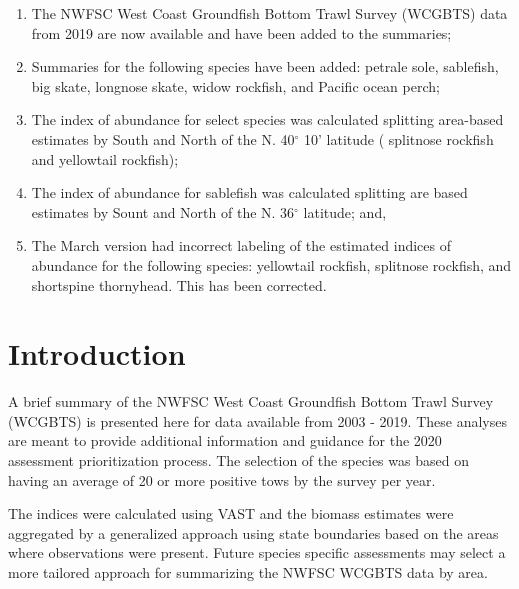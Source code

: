\documentclass[12pt,]{article}
\begin{document}
\begin{enumerate}

\item The NWFSC West Coast Groundfish Bottom Trawl Survey (WCGBTS) data from 2019 are now available and have been added to the summaries;
\item Summaries for the following species have been added: petrale sole, sablefish, big skate, longnose skate, widow rockfish, and Pacific ocean perch;
\item The index of abundance for select species was calculated splitting area-based estimates by South and North of the N. 40$^\circ$ 10' latitude ( splitnose rockfish and yellowtail rockfish);
\item The index of abundance for sablefish was calculated splitting are based estimates by Sount and North of the N. 36$^\circ$ latitude; and,
\item The March version had incorrect labeling of the estimated indices of abundance for the following species: yellowtail rockfish, splitnose rockfish, and shortspine thornyhead.  This has been corrected.

\end{enumerate}

\hypertarget{introduction}{%
\section{Introduction}\label{introduction}}

A brief summary of the NWFSC West Coast Groundfish Bottom Trawl Survey
(WCGBTS) is presented here for data available from 2003 - 2019. These
analyses are meant to provide additional information and guidance for
the 2020 assessment prioritization process. The selection of the species
was based on having an average of 20 or more positive tows by the survey
per year.

The indices were calculated using VAST and the biomass estimates were
aggregated by a generalized approach using state boundaries based on the
areas where observations were present. Future species specific
assessments may select a more tailored approach for summarizing the
NWFSC WCGBTS data by area.
\end{document}
